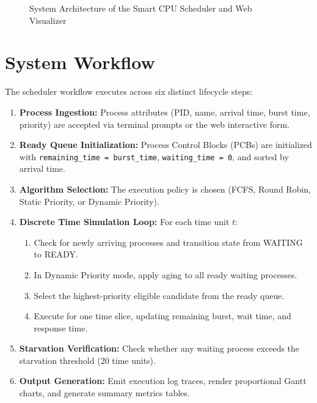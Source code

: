 \documentclass[12pt,a4paper]{report}
\begin{document}
\begin{figure}[H]
\caption{System Architecture of the Smart CPU Scheduler and Web Visualizer}
\label{fig:sys_arch}
\end{figure}

\section{System Workflow}
The scheduler workflow executes across six distinct lifecycle steps:
\begin{enumerate}[leftmargin=1.8em, itemsep=2pt]
  \item \textbf{Process Ingestion:} Process attributes (PID, name, arrival time, burst time, priority) are accepted via terminal prompts or the web interactive form.
  \item \textbf{Ready Queue Initialization:} Process Control Blocks (PCBs) are initialized with \texttt{remaining\_time = burst\_time}, \texttt{waiting\_time = 0}, and sorted by arrival time.
  \item \textbf{Algorithm Selection:} The execution policy is chosen (FCFS, Round Robin, Static Priority, or Dynamic Priority).
  \item \textbf{Discrete Time Simulation Loop:} For each time unit $t$:
    \begin{enumerate}[label=\alph*., itemsep=1pt]
      \item Check for newly arriving processes and transition state from WAITING to READY.
      \item In Dynamic Priority mode, apply aging to all ready waiting processes.
      \item Select the highest-priority eligible candidate from the ready queue.
      \item Execute for one time slice, updating remaining burst, wait time, and response time.
    \end{enumerate}
  \item \textbf{Starvation Verification:} Check whether any waiting process exceeds the starvation threshold (20 time units).
  \item \textbf{Output Generation:} Emit execution log traces, render proportional Gantt charts, and generate summary metrics tables.
\end{enumerate}
\end{document}
